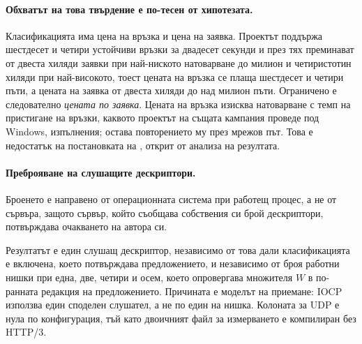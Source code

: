 \paragraph{Обхватът на това твърдение е по-тесен от хипотезата.} Класификацията има цена на
връзка и цена на заявка. Проектът  поддържа шестдесет и четири устойчиви връзки за двадесет
секунди и през тях преминават от двеста хиляди заявки при най-ниското натоварване до милион и
четиристотин хиляди при най-високото, тоест цената на връзка се плаща шестдесет и четири пъти,
а цената на заявка от двеста хиляди до над милион пъти. Ограничено е следователно \emph{цената
по заявка}. Цената на връзка изисква натоварване с темп на пристигане на връзки, каквото
проектът  на същата кампания проведе под Windows, 
изпълнения; остава повторението му през мрежов път. Това е недостатък на постановката на
, открит от анализа на резултата.

\paragraph{Преброяване на слушащите дескриптори.} Броенето е направено от операционната
система при работещ процес, а не от сървъра, защото сървър, който съобщава собствения си брой
дескриптори, потвърждава очакването на автора си.

\begin{table}[H]
\centering\small
\caption{Слушащи дескриптори на работещ процес, отчетени от ядрото}
\label{tab:av-descriptors}
\end{table}

Резултатът е един слушащ дескриптор, независимо от това дали класификацията е включена, което
потвърждава предложението, и независимо от броя работни нишки при една, две, четири и осем,
което опровергава множителя \(W\) в по-ранната редакция на предложението. Причината е моделът
на приемане: IOCP използва един споделен слушател, а не по един на нишка. Колоната за UDP е
нула по конфигурация, тъй като двоичният файл за измерването е компилиран без HTTP/3.

